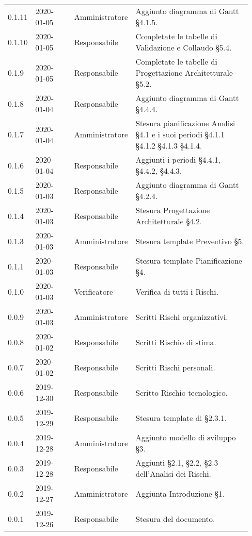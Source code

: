 {\begin{longtable}{C{2cm} C{2cm}  C{3cm}  C{3cm} C{4.5cm}}
0.1.11 & 2020-01-05 & \LD{} & Amministratore & Aggiunto diagramma di Gantt §4.1.5. \\
0.1.10 & 2020-01-05 & \SE{} & Responsabile & Completate le tabelle di Validazione e Collaudo §5.4.\\
0.1.9 & 2020-01-05 & \SE{} & Responsabile & Completate le tabelle di Progettazione Architetturale §5.2. \\
0.1.8 & 2020-01-04 & \SE{} & Responsabile & Aggiunto diagramma di Gantt §4.4.4. \\
0.1.7 & 2020-01-04 & \LD{} & Amministratore & Stesura pianificazione Analisi §4.1 e i suoi periodi §4.1.1 §4.1.2 §4.1.3 §4.1.4. \\
0.1.6 & 2020-01-04 & \SE{} & Responsabile & Aggiunti i periodi §4.4.1, §4.4.2, §4.4.3. \\
0.1.5 & 2020-01-03 & \SE{} & Responsabile & Aggiunto diagramma di Gantt §4.2.4. \\
0.1.4 & 2020-01-03 & \SE{} & Responsabile & Stesura Progettazione Architetturale §4.2.\\
0.1.3 & 2020-01-03 & \LD{} & Amministratore & Stesura template Preventivo §5. \\
0.1.1 & 2020-01-03 & \SE{} & Responsabile & Stesura template Pianificazione §4. \\
0.1.0 & 2020-01-03 & \AT{} & Verificatore & Verifica di tutti i Rischi. \\
0.0.9 & 2020-01-03 & \LD{} & Amministratore & Scritti Rischi organizzativi. \\
0.0.8 & 2020-01-02 & \SE{} & Responsabile & Scritti Rischio di stima. \\
0.0.7 & 2020-01-02 & \SE{} & Responsabile & Scritti Rischi personali. \\
0.0.6 & 2019-12-30 & \SE{} & Responsabile & Scritto Rischio tecnologico. \\
0.0.5 & 2019-12-29 & \SE{} & Responsabile & Stesura template di §2.3.1. \\
0.0.4 & 2019-12-28 & \LD{} & Amministratore & Aggiunto modello di sviluppo §3. \\
0.0.3 & 2019-12-28 & \SE{} & Responsabile & Aggiunti §2.1, §2.2, §2.3 dell'Analisi dei Rischi. \\
0.0.2 & 2019-12-27 & \LD{} & Amministratore & Aggiunta Introduzione §1. \\
0.0.1 & 2019-12-26 & \SE{} & Responsabile & Stesura del documento. \\
		
\end{longtable}
}
